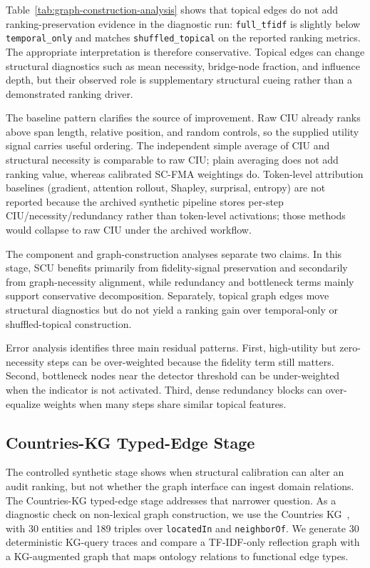 \documentclass[a4paper,fleqn]{cas-sc}
\begin{document}
Table~\ref{tab:graph-construction-analysis} shows that topical edges do not add ranking-preservation evidence in the diagnostic run: \texttt{full\_tfidf} is slightly below \texttt{temporal\_only} and matches \texttt{shuffled\_topical} on the reported ranking metrics. The appropriate interpretation is therefore conservative. Topical edges can change structural diagnostics such as mean necessity, bridge-node fraction, and influence depth, but their observed role is supplementary structural cueing rather than a demonstrated ranking driver.

The baseline pattern clarifies the source of improvement. Raw CIU already ranks above span length, relative position, and random controls, so the supplied utility signal carries useful ordering. The independent simple average of CIU and structural necessity is comparable to raw CIU; plain averaging does not add ranking value, whereas calibrated SC-FMA weightings do. Token-level attribution baselines (gradient, attention rollout, Shapley, surprisal, entropy) are not reported because the archived synthetic pipeline stores per-step CIU/necessity/redundancy rather than token-level activations; those methods would collapse to raw CIU under the archived workflow.

The component and graph-construction analyses separate two claims. In this stage, SCU benefits primarily from fidelity-signal preservation and secondarily from graph-necessity alignment, while redundancy and bottleneck terms mainly support conservative decomposition. Separately, topical graph edges move structural diagnostics but do not yield a ranking gain over temporal-only or shuffled-topical construction.

Error analysis identifies three main residual patterns. First, high-utility but zero-necessity steps can be over-weighted because the fidelity term still matters. Second, bottleneck nodes near the detector threshold can be under-weighted when the indicator is not activated. Third, dense redundancy blocks can over-equalize weights when many steps share similar topical features.

\subsection{Countries-KG Typed-Edge Stage}
\label{sec:kg-pilot}

The controlled synthetic stage shows when structural calibration can alter an audit ranking, but not whether the graph interface can ingest domain relations. The Countries-KG typed-edge stage addresses that narrower question. As a diagnostic check on non-lexical graph construction, we use the Countries KG~\cite{bordes2013translating}, with 30 entities and 189 triples over \texttt{locatedIn} and \texttt{neighborOf}. We generate 30 deterministic KG-query traces and compare a TF-IDF-only reflection graph with a KG-augmented graph that maps ontology relations to functional edge types.
\end{document}
